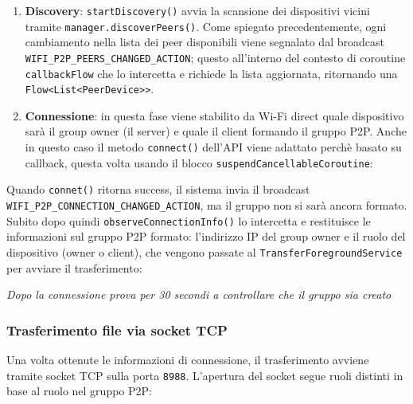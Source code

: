 \begin{enumerate}[leftmargin=1.4cm]
    \item \textbf{Discovery}: \texttt{startDiscovery()} avvia la scansione dei dispositivi vicini tramite \texttt{manager.\allowbreak discoverPeers()}. Come spiegato precedentemente, ogni cambiamento nella lista dei peer disponibili viene segnalato dal broadcast \texttt{WIFI\_P2P\_\allowbreak PEERS\_\allowbreak CHANGED\_\allowbreak ACTION}; questo all'interno del contesto di coroutine \texttt{callbackFlow} che lo intercetta e richiede la lista aggiornata, ritornando una \texttt{Flow<List<\allowbreak PeerDevice>>}.

    \pagebreak
    \item \textbf{Connessione}: in questa fase viene stabilito da Wi-Fi direct quale dispositivo sarà il group owner (il server) e quale il client formando il gruppo P2P. Anche in questo caso il metodo \texttt{connect()} dell'API viene adattato perchè basato su callback, questa volta usando il blocco \texttt{suspendCancellableCoroutine}:
\end{enumerate}


Quando \texttt{connet()} ritorna success, il sistema invia il broadcast \texttt{WIFI\_P2P\_\allowbreak CONNECTION\_\allowbreak CHANGED\_\allowbreak ACTION}, ma il gruppo non si sarà ancora formato. Subito dopo quindi \texttt{observeConnectionInfo()} lo intercetta e restituisce le informazioni sul gruppo P2P formato: l'indirizzo IP del group owner e il ruolo del dispositivo (owner o client), che vengono passate al \texttt{Transfer\-Foreground\-Service} per avviare il trasferimento:

{\small\color{onSurfaceVariant}\itshape\centering Dopo la connessione prova per 30 secondi a controllare che il gruppo sia creato\par}
\vspace{4pt}

\subsubsection*{Trasferimento file via socket TCP}

Una volta ottenute le informazioni di connessione, il trasferimento avviene tramite socket TCP sulla porta \texttt{8988}. L'apertura del socket segue ruoli distinti in base al ruolo nel gruppo P2P:



